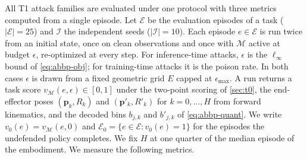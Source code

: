 All T1 attack families are evaluated under one protocol with
three metrics computed from a single episode. 
Let $\mathcal{E}$ be the evaluation episodes of a task ($|\mathcal{E}|{=}25$) and $\mathcal{I}$ the independent seeds ($|\mathcal{I}|{=}10$). Each
episode $e\in\mathcal{E}$ is run twice from an initial state, once on clean observations and once with $\mathcal{M}$ active at budget $\epsilon$, re-optimized at every step. 
For inference-time attacks, $\epsilon$ is the $\ell_{\infty}$ bound of \autoref{eq:abbp-obj}; for training-time attacks it is the poison rate. 
In both cases $\epsilon$ is drawn from a fixed geometric grid $E$ capped at $\epsilon_{\max}$. A run returns a task score $v_{\mathcal{M}}(e,\epsilon)\in[0,1]$ under the two-point scoring of \autoref{sec:t0}, the end-effector poses $(\bm{p}_{k},R_{k})$ and $(\bm{p}'_{k},R'_{k})$ for $k=0,\dots,H$ from forward kinematics, and the decoded bins $b_{j,k}$ and $b'_{j,k}$ of \autoref{eq:abbp-quant}.
We write $v_{0}(e)=v_{\mathcal{M}}(e,0)$ and $\mathcal{E}_{0}=\{e\in\mathcal{E}:v_{0}(e)=1\}$ for the episodes the undefended policy completes. We fix $H$ at one quarter of the median episode of the embodiment. We measure the following metrics.

